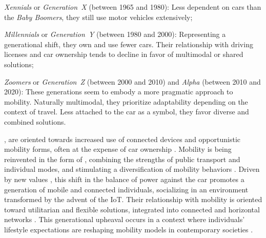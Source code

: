 \begin{refsegment}
{\begin{customitemize}
    \item \textsl{Xennials} or \textsl{Generation~X} (between 1965 and 1980): Less dependent on cars than the \textsl{Baby Boomers}, they still use motor vehicles extensively;
    \item \textsl{Millennials} or \textsl{Generation~Y} (between 1980 and 2000): Representing a generational shift, they own and use fewer cars. Their relationship with driving licenses and car ownership tends to decline in favor of multimodal or shared solutions;
    \item \textsl{Zoomers} or \textsl{Generation~Z} (between 2000 and 2010) and \textsl{Alpha} (between 2010 and 2020): These generations seem to embody a more pragmatic approach to mobility. Naturally multimodal, they prioritize adaptability depending on the context of travel. Less attached to the car as a symbol, they favor diverse and combined solutions.
        \end{customitemize}
}, are oriented towards increased use of connected devices and opportunistic mobility forms, often at the expense of car ownership \textcolor{blue}{\autocite[25]{litman_future_2020}}. Mobility is being reinvented in the form of , combining the strengths of public transport and individual modes, and stimulating a diversification of mobility behaviors \textcolor{blue}{\autocite[20]{amar_du_2012}}. Driven by new values \textcolor{blue}{\autocite{lacombled_smart_2014}}, this shift in the balance of power against the car promotes a generation of mobile and connected individuals, socializing in an environment transformed by the advent of the \acrshort{IoT}. Their relationship with mobility is oriented toward utilitarian and flexible solutions, integrated into connected and horizontal networks \textcolor{blue}{\autocite{bloomberg_citylab_clearest_2015}}. This generational upheaval occurs in a context where individuals' lifestyle expectations are reshaping mobility models in contemporary societies \textcolor{blue}{\autocites{circella_what_2016}{garikapati_activity_2016}{tilley_multi-level_2017}}.%


\end{refsegment}
